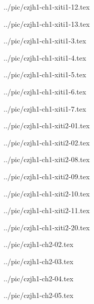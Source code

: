 

../pic/czjh1-ch1-xiti1-12.tex



../pic/czjh1-ch1-xiti1-13.tex



../pic/czjh1-ch1-xiti1-3.tex



../pic/czjh1-ch1-xiti1-4.tex



../pic/czjh1-ch1-xiti1-5.tex



../pic/czjh1-ch1-xiti1-6.tex



../pic/czjh1-ch1-xiti1-7.tex



../pic/czjh1-ch1-xiti2-01.tex



../pic/czjh1-ch1-xiti2-02.tex



../pic/czjh1-ch1-xiti2-08.tex



../pic/czjh1-ch1-xiti2-09.tex



../pic/czjh1-ch1-xiti2-10.tex



../pic/czjh1-ch1-xiti2-11.tex



../pic/czjh1-ch1-xiti2-20.tex



../pic/czjh1-ch2-02.tex



../pic/czjh1-ch2-03.tex



../pic/czjh1-ch2-04.tex



../pic/czjh1-ch2-05.tex

